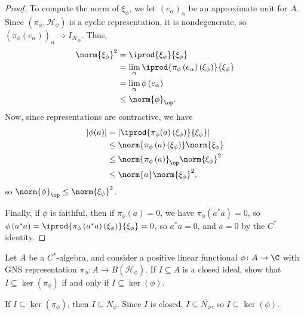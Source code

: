 \documentclass[10pt]{mypackage}
\begin{document}
\begin{proof}
  To compute the norm of $\xi_{\phi}$, we let $\left(e_{\alpha}\right)_{\alpha}$ be an approximate unit for $A$. Since $\left(\pi_{\phi},\mathcal{H}_{\phi}\right)$ is a cyclic representation, it is nondegenerate, so $\left(\pi_{\phi}\left(e_{\alpha}\right)\right)_{\alpha}\rightarrow I_{\mathcal{H}_{\phi}}$. Thus,
  \begin{align*}
    \norm{\xi_{\phi}}^2 &= \iprod{\xi_{\phi}}{\xi_{\phi}}\\
                        &= \lim_{\alpha} \iprod{\pi_{\phi}\left(e_{\alpha}\right)\left(\xi_{\phi}\right)}{\xi_{\phi}}\\
                        &= \lim_{\alpha}\phi\left(e_{\alpha}\right)\\
                        &\leq \norm{\phi}_{\op}.
  \end{align*}
  Now, since representations are contractive, we have
  \begin{align*}
    \left\vert \phi(a) \right\vert &= \left\vert \iprod{\pi_{\phi}(a)\left(\xi_{\phi}\right)}{\xi_{\phi}} \right\vert\\
                                   &\leq \norm{\pi_{\phi}\left(a\right)\left(\xi_{\phi}\right)} \norm{\xi_{\phi}}\\
                                   &\leq \norm{\pi_{\phi}\left(a\right)}_{\op}\norm{\xi_{\phi}}^2\\
                                   &\leq \norm{a}\norm{\xi_{\phi}}^2,
  \end{align*}
  so $\norm{\phi}_{\op}\leq \norm{\xi_{\phi}}^2$.\newline

  Finally, if $\phi$ is faithful, then if $\pi_{\phi}(a) = 0$, we have $\pi_{\phi}\left(a^{\ast}a\right) = 0$, so $\phi\left(a^{\ast}a\right)  = \iprod{\pi_{\phi}\left(a^{\ast}a\right)\left(\xi_{\phi}\right)}{\xi_{\phi}} = 0$, so $a^{\ast}a = 0$, and $a = 0$ by the $C^{\ast}$ identity.
\end{proof}
\begin{exercise}
  Let $A$ be a $C^{\ast}$-algebra, and consider a positive linear functional $\phi\colon A\rightarrow \C$ with GNS representation $\pi_{\phi}\colon A\rightarrow B\left(\mathcal{H}_{\phi}\right)$. If $I\subseteq A$ is a closed ideal, show that $I\subseteq \ker\left(\pi_{\phi}\right)$ if and only if $I\subseteq \ker\left(\phi\right)$.
\end{exercise}
\begin{solution}
  If $I\subseteq \ker\left(\pi_{\phi}\right)$, then $I\subseteq N_{\phi}$. Since $I$ is closed, $I\subseteq \overline{N_{\phi}}$, so $I\subseteq \ker\left(\phi\right)$.
\end{solution}
\end{document}

